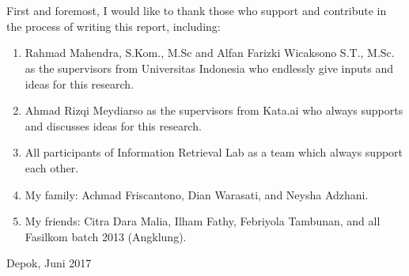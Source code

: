 \chapter*{\kataPengantar}
First and foremost, I would like to thank those who support and contribute in the process of writing this report, including:
%
%
\begin{enumerate}
	\item Rahmad Mahendra, S.Kom., M.Sc and Alfan Farizki Wicaksono S.T., M.Sc. as the supervisors from Universitas Indonesia who endlessly give inputs and ideas for this research.
	\item Ahmad Rizqi Meydiarso as the supervisors from Kata.ai who always supports and discusses ideas for this research.
	\item All participants of Information Retrieval Lab as a team which always support each other.
	\item My family: Achmad Friscantono, Dian Warasati, and Neysha Adzhani.
	\item My friends: Citra Dara Malia, Ilham Fathy, Febriyola Tambunan, and all Fasilkom batch 2013 (Angklung).
\end{enumerate}
\vspace*{0.1cm}
\begin{flushright}
Depok, Juni 2017\\[0.1cm]
\vspace*{1cm}
\penulis

\end{flushright}